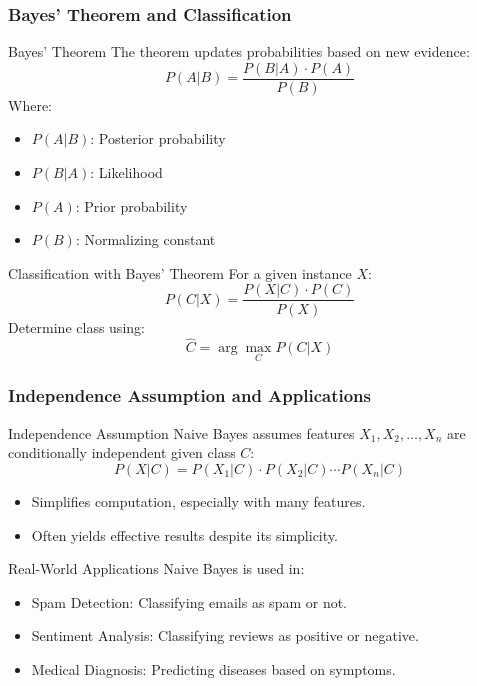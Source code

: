 \documentclass[aspectratio=169]{beamer}
\begin{document}
\begin{frame}[fragile]
    \frametitle{Bayes' Theorem and Classification}
    \begin{block}{Bayes' Theorem}
        The theorem updates probabilities based on new evidence:
        \begin{equation}
            P(A|B) = \frac{P(B|A) \cdot P(A)}{P(B)}
        \end{equation}
        Where:
        \begin{itemize}
            \item $P(A|B)$: Posterior probability
            \item $P(B|A)$: Likelihood
            \item $P(A)$: Prior probability
            \item $P(B)$: Normalizing constant
        \end{itemize}
    \end{block}
    \begin{block}{Classification with Bayes' Theorem}
        For a given instance \( X \):
        \begin{equation}
            P(C|X) = \frac{P(X|C) \cdot P(C)}{P(X)}
        \end{equation}
        Determine class using:
        \begin{equation}
            \hat{C} = \arg\max_{C} P(C|X)
        \end{equation}
    \end{block}
\end{frame}

\begin{frame}[fragile]
    \frametitle{Independence Assumption and Applications}
    \begin{block}{Independence Assumption}
        Naive Bayes assumes features \( X_1, X_2, \ldots, X_n \) are conditionally independent given class \( C \):
        \begin{equation}
            P(X|C) = P(X_1|C) \cdot P(X_2|C) \cdots P(X_n|C)
        \end{equation}
        \begin{itemize}
            \item Simplifies computation, especially with many features.
            \item Often yields effective results despite its simplicity.
        \end{itemize}
    \end{block}
    \begin{block}{Real-World Applications}
        Naive Bayes is used in:
        \begin{itemize}
            \item Spam Detection: Classifying emails as spam or not.
            \item Sentiment Analysis: Classifying reviews as positive or negative.
            \item Medical Diagnosis: Predicting diseases based on symptoms.
        \end{itemize}
    \end{block}
\end{frame}
\end{document}
